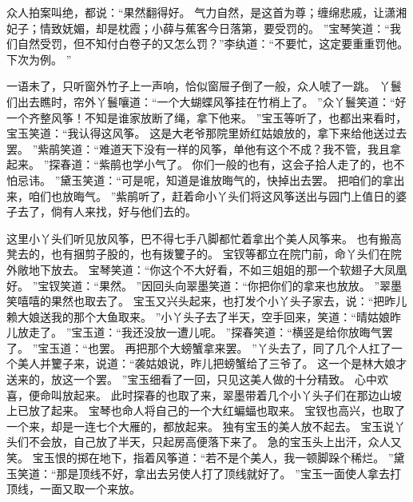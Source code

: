 \hop
众人拍案叫绝，都说：“果然翻得好。
气力自然，是这首为尊；缠绵悲戚，让潇湘妃子；情致妩媚，却是枕霞；小薛与蕉客今日落第，要受罚的。
”宝琴笑道：“我们自然受罚，但不知付白卷子的又怎么罚？”李纨道：“不要忙，这定要重重罚他。
下次为例。
”\par
\par
一语未了，只听窗外竹子上一声响，恰似窗屉子倒了一般，众人唬了一跳。
丫鬟们出去瞧时，帘外丫鬟嚷道：“一个大蝴蝶风筝挂在竹梢上了。
”众丫鬟笑道：“好一个齐整风筝！不知是谁家放断了绳，拿下他来。
”宝玉等听了，也都出来看时，宝玉笑道：“我认得这风筝。
这是大老爷那院里娇红姑娘放的，拿下来给他送过去罢。
”紫鹃笑道：“难道天下没有一样的风筝，单他有这个不成？我不管，我且拿起来。
”探春道：“紫鹃也学小气了。
你们一般的也有，这会子拾人走了的，也不怕忌讳。
”黛玉笑道：“可是呢，知道是谁放晦气的，快掉出去罢。
把咱们的拿出来，咱们也放晦气。
”紫鹃听了，赶着命小丫头们将这风筝送出与园门上值日的婆子去了，倘有人来找，好与他们去的。
\par
这里小丫头们听见放风筝，巴不得七手八脚都忙着拿出个美人风筝来。
也有搬高凳去的，也有捆剪子股的，也有拨籰子的。
宝钗等都立在院门前，命丫头们在院外敞地下放去。
宝琴笑道：“你这个不大好看，不如三姐姐的那一个软翅子大凤凰好。
”宝钗笑道：“果然。
”因回头向翠墨笑道：“你把你们的拿来也放放。
”翠墨笑嘻嘻的果然也取去了。
宝玉又兴头起来，也打发个小丫头子家去，说：“把昨儿赖大娘送我的那个大鱼取来。
”小丫头子去了半天，空手回来，笑道：“晴姑娘昨儿放走了。
”宝玉道：“我还没放一遭儿呢。
”探春笑道：“横竖是给你放晦气罢了。
”宝玉道：“也罢。
再把那个大螃蟹拿来罢。
”丫头去了，同了几个人扛了一个美人并籰子来，说道：“袭姑娘说，昨儿把螃蟹给了三爷了。
这一个是林大娘才送来的，放这一个罢。
”宝玉细看了一回，只见这美人做的十分精致。
心中欢喜，便命叫放起来。
此时探春的也取了来，翠墨带着几个小丫头子们在那边山坡上已放了起来。
宝琴也命人将自己的一个大红蝙蝠也取来。
宝钗也高兴，也取了一个来，却是一连七个大雁的，都放起来。
独有宝玉的美人放不起去。
宝玉说丫头们不会放，自己放了半天，只起房高便落下来了。
急的宝玉头上出汗，众人又笑。
宝玉恨的掷在地下，指着风筝道：“若不是个美人，我一顿脚跺个稀烂。
”黛玉笑道：“那是顶线不好，拿出去另使人打了顶线就好了。
”宝玉一面使人拿去打顶线，一面又取一个来放。
